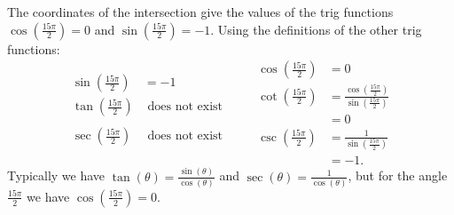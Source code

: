 \documentclass[nooutcomes]{ximera}
\begin{document}
\begin{exercise}
\begin{explanation}
\begin{enumerate}
\begin{image}
				\end{image}
			
				The coordinates of the intersection give the values of the trig functions
				$\cos\left( \frac{15\pi}{2} \right) = 0$ and $\sin\left( \frac{15\pi}{2}\right) = -1$. Using the definitions of the other trig
				 functions:
				$$
				  \begin{aligned}
				  \sin\left( \frac{15\pi}{2} \right) &= -1\\
				  \tan\left( \frac{15\pi}{2} \right) & \text{ does not exist} \\
				  	\\
				  \sec\left( \frac{15\pi}{2} \right) &\text{ does not exist} \\
				  \quad &
				  \end{aligned}
				  \qquad
				  \begin{aligned}
				  \cos\left( \frac{15\pi}{2} \right) &= 0\\
				  \cot\left( \frac{15\pi}{2} \right) &= \frac{\cos\left( \frac{15\pi}{2} \right)}{\sin\left( \frac{15\pi}{2} \right)}\\
					&= 0\\
				  \csc\left( \frac{15\pi}{2} \right) &= \frac{1}{\sin\left( \frac{15\pi}{2} \right)}\\
				  	&= -1.    
				  \end{aligned}
				  $$
				 Typically we have $\tan(\theta) = \frac{\sin(\theta)}{\cos(\theta)}$ and $\sec(\theta) = \frac{1}{\cos(\theta)}$, but for the angle
				 $\frac{15\pi}{2}$ we have $\cos\left( \frac{15\pi}{2} \right) = 0$.
		\end{enumerate}	
	\end{explanation}
\end{exercise}
\end{document}
